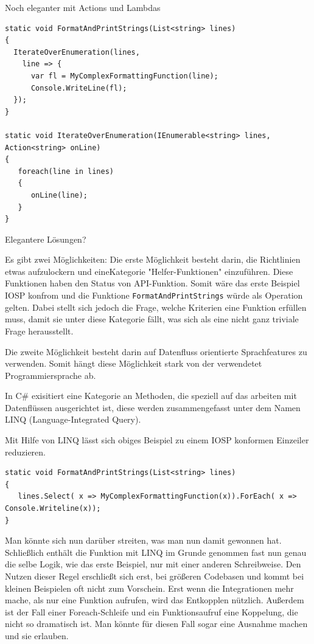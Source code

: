 \documentclass[11pt]{article}
\begin{document}
Noch eleganter mit Actions und Lambdas

\begin{verbatim}
static void FormatAndPrintStrings(List<string> lines)
{
  IterateOverEnumeration(lines,
    line => {
      var fl = MyComplexFormattingFunction(line);
      Console.WriteLine(fl);
  });
}

static void IterateOverEnumeration(IEnumerable<string> lines, Action<string> onLine)
{
   foreach(line in lines)
   {
      onLine(line);
   }
}
\end{verbatim}


Elegantere Lösungen?

Es gibt zwei Möglichkeiten: Die erste Möglichkeit besteht darin, die Richtlinien etwas aufzulockern und eineKategorie "Helfer-Funktionen" einzuführen.
Diese Funktionen haben den Status von API-Funktion. Somit wäre das erste Beispiel IOSP konfrom und die Funktione \texttt{FormatAndPrintStrings}
würde als Operation gelten.
Dabei stellt sich jedoch die Frage, welche Kriterien eine Funktion erfüllen muss, damit sie unter diese Kategorie 
fällt, was sich als eine nicht ganz triviale Frage herausstellt.

Die zweite Möglichkeit besteht darin auf Datenfluss orientierte Sprachfeatures zu verwenden.
Somit hängt diese Möglichkeit stark von der verwendetet Programmiersprache ab.

In C\# exisitiert eine Kategorie an Methoden, die speziell auf das arbeiten mit Datenflüssen ausgerichtet ist, diese werden 
zusammengefasst unter dem Namen LINQ (Language-Integrated Query).

Mit Hilfe von LINQ lässt sich obiges Beispiel zu einem IOSP konformen Einzeiler reduzieren.

\begin{verbatim}
static void FormatAndPrintStrings(List<string> lines)
{
   lines.Select( x => MyComplexFormattingFunction(x)).ForEach( x => Console.Writeline(x));
}
\end{verbatim}
Man könnte sich nun darüber streiten, was man nun damit gewonnen hat. Schließlich enthält die Funktion mit LINQ im Grunde
genommen fast nun genau die selbe Logik, wie das erste Beispiel, nur mit einer anderen Schreibweise.
Den Nutzen dieser Regel erschließt sich erst, bei größeren Codebasen und kommt bei kleinen Beispielen oft nicht zum Vorschein.
Erst wenn die Integrationen mehr mache, als nur eine Funktion aufrufen, wird das Entkopplen nützlich.
Außerdem ist der Fall einer Foreach-Schleife und ein Funktionsaufruf eine Koppelung, die nicht so dramatisch ist. Man
könnte für diesen Fall sogar eine Ausnahme machen und sie erlauben.
\end{document}
